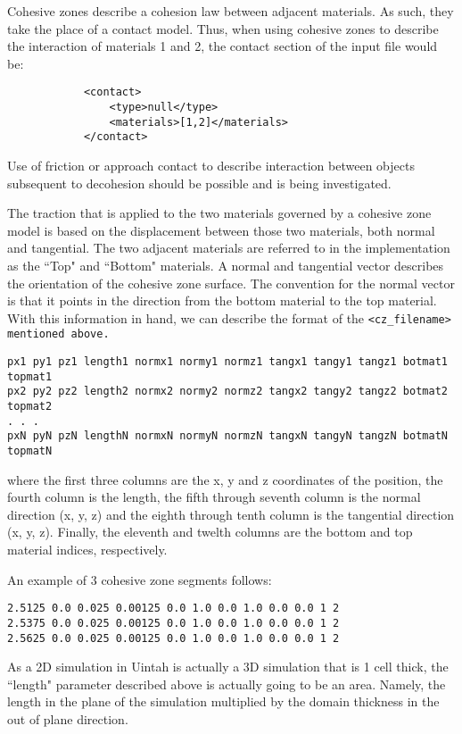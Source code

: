 Cohesive zones describe a cohesion law between adjacent materials. As such,
they take the place of a contact model.  Thus, when using cohesive zones to
describe the interaction of materials 1 and 2, the contact section of the input
file would be:

\begin{Verbatim}
            <contact>
                <type>null</type>
                <materials>[1,2]</materials>
            </contact>
\end{Verbatim}

Use of friction or approach contact to describe interaction between objects
subsequent to decohesion should be possible and is being investigated.

The traction that is applied to the two materials governed by a
cohesive zone model is based on the displacement between those two materials,
both normal and tangential.  The two adjacent materials are referred to in the
implementation as the ``Top" and ``Bottom" materials.  A normal and tangential
vector describes the orientation of the cohesive zone surface.  The convention
for the normal vector is that it points in the direction from the bottom
material to the top material.  With this information in hand, we can describe
the format of the \tt <cz\_filename> \normalfont mentioned above.

\begin{Verbatim}
px1 py1 pz1 length1 normx1 normy1 normz1 tangx1 tangy1 tangz1 botmat1 topmat1
px2 py2 pz2 length2 normx2 normy2 normz2 tangx2 tangy2 tangz2 botmat2 topmat2
. . .
pxN pyN pzN lengthN normxN normyN normzN tangxN tangyN tangzN botmatN topmatN
\end{Verbatim}

where the first three columns are the x, y and z coordinates of the position, 
the fourth column is the length, the fifth through seventh column is the normal
direction (x, y, z) and the eighth through tenth column is the tangential
direction (x, y, z).  Finally, the eleventh and twelth columns are the bottom
and top material indices, respectively.

An example of 3 cohesive zone segments follows:

\begin{Verbatim}
2.5125 0.0 0.025 0.00125 0.0 1.0 0.0 1.0 0.0 0.0 1 2
2.5375 0.0 0.025 0.00125 0.0 1.0 0.0 1.0 0.0 0.0 1 2
2.5625 0.0 0.025 0.00125 0.0 1.0 0.0 1.0 0.0 0.0 1 2
\end{Verbatim}

As a 2D simulation in Uintah is actually a 3D simulation that is 1 cell thick,
the ``length" parameter described above is actually going to be an area.
Namely, the length in the plane of the simulation multiplied by the domain
thickness in the out of plane direction.

